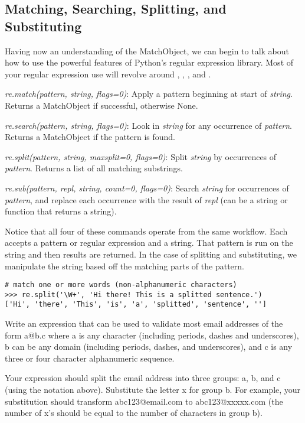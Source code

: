 \subsection*{Matching, Searching, Splitting, and Substituting}
Having now an understanding of the MatchObject, we can begin to talk about how to use the powerful features of Python's regular expression library.
Most of your regular expression use will revolve around , , , and .
\begin{description}
\item \emph{re.match(pattern, string, flags=0)}:  Apply a pattern beginning at start of \emph{string}.  Returns a MatchObject if successful, otherwise None.
\item \emph{re.search(pattern, string, flags=0)}:  Look in \emph{string} for any occurrence of \emph{pattern}.  Returns a MatchObject if the pattern is found.
\item \emph{re.split(pattern, string, maxsplit=0, flags=0)}: Split \emph{string} by occurrences of \emph{pattern}.  Returns a list of all matching substrings.
\item \emph{re.sub(pattern, repl, string, count=0, flags=0)}: Search \emph{string} for occurrences of \emph{pattern}, and replace each occurrence with the result of \emph{repl} (can be a string or function that returns a string).
\end{description}
Notice that all four of these commands operate from the same workflow.
Each accepts a pattern or regular expression and a string.
That pattern is run on the string and then results are returned.
In the case of splitting and substituting, we manipulate the string based off the matching parts of the pattern.
\begin{lstlisting}
# match one or more words (non-alphanumeric characters)
>>> re.split('\W+', 'Hi there! This is a splitted sentence.')
['Hi', 'there', 'This', 'is', 'a', 'splitted', 'sentence', '']
\end{lstlisting}

\begin{problem}
Write an expression that can be used to validate most email addresses of the form a@b.c where a is any character (including periods, dashes and underscores), b can be any domain (including periods, dashes, and underscores), and c is any three or four character alphanumeric sequence.

Your expression should split the email address into three groups: a, b, and c (using the notation above).
Substitute the letter x for group b.
For example, your substitution should transform abc123@email.com to abc123@xxxxx.com (the number of x's should be equal to the number of characters in group b).
\label{prob:emailvaldiator}
\end{problem}

